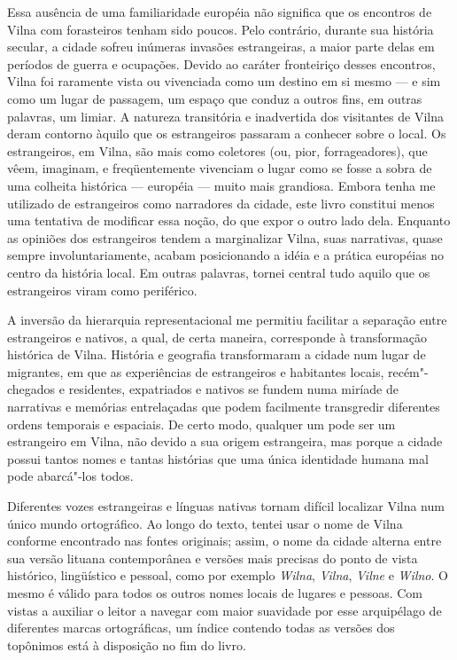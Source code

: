 Essa ausência de uma familiaridade européia não significa que os
encontros de Vilna com forasteiros tenham sido poucos. Pelo contrário,
durante sua história secular, a cidade sofreu inúmeras invasões
estrangeiras, a maior parte delas em períodos de guerra e ocupações.
Devido ao caráter fronteiriço desses encontros, Vilna foi raramente
vista ou vivenciada como um destino em si mesmo --- e sim como um lugar de
passagem, um espaço que conduz a outros fins, em outras palavras, um
limiar. A natureza transitória e inadvertida dos visitantes de Vilna
deram contorno àquilo que os estrangeiros passaram a conhecer sobre o
local. Os estrangeiros, em Vilna, são mais como coletores (ou, pior,
forrageadores), que vêem, imaginam, e freqüentemente vivenciam o lugar
como se fosse a sobra de uma colheita histórica --- européia --- muito mais
grandiosa. Embora tenha me utilizado de estrangeiros como narradores da
cidade, este livro constitui menos uma tentativa de modificar essa
noção, do que expor o outro lado dela. Enquanto as opiniões dos
estrangeiros tendem a marginalizar Vilna, suas narrativas, quase sempre
involuntariamente, acabam posicionando a idéia e a prática européias no
centro da história local. Em outras palavras, tornei central tudo aquilo
que os estrangeiros viram como periférico.

A inversão da hierarquia representacional me permitiu facilitar a
separação entre estrangeiros e nativos, a qual, de certa maneira,
corresponde à transformação histórica de Vilna. História e geografia
transformaram a cidade num lugar de migrantes, em que as experiências de
estrangeiros e habitantes locais, recém"-chegados e residentes,
expatriados e nativos se fundem numa miríade de narrativas e memórias
entrelaçadas que podem facilmente transgredir diferentes ordens
temporais e espaciais. De certo modo, qualquer um pode ser um
estrangeiro em Vilna, não devido a sua origem estrangeira, mas porque a
cidade possui tantos nomes e tantas histórias que uma única identidade
humana mal pode abarcá"-los todos.

Diferentes vozes estrangeiras e línguas nativas tornam difícil localizar
Vilna num único mundo ortográfico. Ao longo do texto, tentei usar o nome
de Vilna conforme encontrado nas fontes originais; assim, o nome da
cidade alterna entre sua versão lituana contemporânea e versões mais
precisas do ponto de vista histórico, lingüístico e pessoal, como por
exemplo \emph{Wilna}, \emph{Vilna}, \emph{Vilne} e \emph{Wilno}. O mesmo
é válido para todos os outros nomes locais de lugares e pessoas. Com
vistas a auxiliar o leitor a navegar com maior suavidade por esse
arquipélago de diferentes marcas ortográficas, um índice contendo todas
as versões dos topônimos está à disposição no fim do livro.


